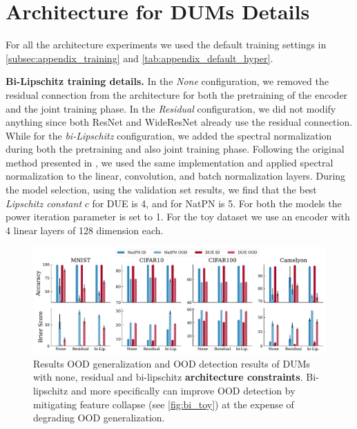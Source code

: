 \section{Architecture for DUMs Details}
\label{subsec:appendix_encoder}





For all the architecture experiments we used the default training settings in \cref{subsec:appendix_training} and \cref{tab:appendix_default_hyper}.

\textbf{Bi-Lipschitz training details.} In the \textit{None} configuration, we removed the residual connection from the architecture for both the pretraining of the encoder and the joint training phase. In the \textit{Residual} configuration, we did not modify anything since both ResNet and WideResNet already use the residual connection. While for the \textit{bi-Lipschitz} configuration, we added the spectral normalization during both the pretraining and also joint training phase. Following the original method presented in \cite{van2021due}, we used the same implementation and applied spectral normalization to the linear, convolution, and batch normalization layers. During the model selection, using the validation set results, we find that the best \textit{Lipschitz constant} $c$ for DUE is 4, and for NatPN is 5. For both the models the power iteration parameter is set to 1. For the toy dataset we use an encoder with 4 linear layers of 128 dimension each.

\begin{figure}[!htb]
    \centering
    \includegraphics[width=\textwidth]{sections/008_iclr2023/figures/bi_bar.pdf}
    \caption{Results OOD generalization and OOD detection results of DUMs with none, residual and bi-lipschitz \textbf{architecture constraints}. Bi-lipschitz and more specifically can improve OOD detection by mitigating feature collapse (see \cref{fig:bi_toy}) at the expense of degrading OOD generalization.}
    \label{fig:bi_bar_full}
\end{figure}

